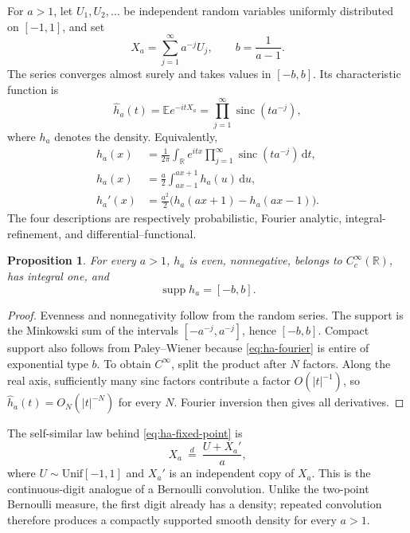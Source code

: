 \documentclass[11pt]{article}
\newtheorem{proposition}[theorem]{Proposition}
\theoremstyle{definition}
\theoremstyle{remark}
\newcommand{\sinc}{\operatorname{sinc}}
\newcommand{\supp}{\operatorname{supp}}
\newcommand{\E}{\mathbb{E}}
\newcommand{\R}{\mathbb{R}}
\newcommand{\dd}{\,\mathrm{d}}
\begin{document}
For \(a>1\), let \(U_1,U_2,\ldots\) be independent random variables uniformly distributed on \([-1,1]\), and set
\begin{equation}
  X_a=\sum_{j=1}^{\infty}a^{-j}U_j,
  \qquad b=\frac1{a-1}.
  \label{eq:Xa}
\end{equation}
The series converges almost surely and takes values in \([-b,b]\).  Its characteristic function is
\begin{equation}
  \widehat h_a(t)=\E e^{-itX_a}
   =\prod_{j=1}^{\infty}\sinc(ta^{-j}),
  \label{eq:ha-fourier}
\end{equation}
where \(h_a\) denotes the density.  Equivalently,
\begin{align}
 h_a(x)&=\frac1{2\pi}\int_{\R}e^{itx}
    \prod_{j=1}^{\infty}\sinc(ta^{-j})\dd t,
    \label{eq:ha-inverse-fourier}\\
 h_a(x)&=\frac a2\int_{ax-1}^{ax+1}h_a(u)\dd u,
    \label{eq:ha-fixed-point}\\
 h_a'(x)&=\frac{a^2}{2}\bigl(h_a(ax+1)-h_a(ax-1)\bigr).
    \label{eq:ha-derivative}
\end{align}
The four descriptions are respectively probabilistic, Fourier analytic, integral-refinement, and differential--functional.

\begin{proposition}
For every \(a>1\), \(h_a\) is even, nonnegative, belongs to \(C_c^\infty(\R)\), has integral one, and
\begin{equation}
  \supp h_a=[-b,b].
  \label{eq:ha-support}
\end{equation}
\end{proposition}

\begin{proof}
Evenness and nonnegativity follow from the random series.  The support is the Minkowski sum of the intervals \([-a^{-j},a^{-j}]\), hence \([-b,b]\).  Compact support also follows from Paley--Wiener because \eqref{eq:ha-fourier} is entire of exponential type \(b\).  To obtain \(C^\infty\), split the product after \(N\) factors.  Along the real axis, sufficiently many sinc factors contribute a factor \(O(|t|^{-1})\), so \(\widehat h_a(t)=O_N(|t|^{-N})\) for every \(N\).  Fourier inversion then gives all derivatives.
\end{proof}

The self-similar law behind \eqref{eq:ha-fixed-point} is
\begin{equation}
  X_a\ \overset{d}=\ \frac{U+X_a'}{a},
  \label{eq:distributional-fixed-point}
\end{equation}
where \(U\sim\mathrm{Unif}[-1,1]\) and \(X_a'\) is an independent copy of \(X_a\).  This is the continuous-digit analogue of a Bernoulli convolution.  Unlike the two-point Bernoulli measure, the first digit already has a density; repeated convolution therefore produces a compactly supported smooth density for every \(a>1\).
\end{document}
